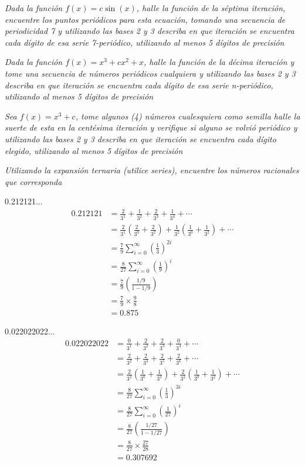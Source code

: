 \documentclass[11pt]{report}
\theoremstyle{plain}
\theoremstyle{definition}
\begin{document}
\textit{Dada la función $f (x) = c \sin(x) $, halle la función de la séptima iteración, encuentre los puntos periódicos para esta ecuación, tomando una secuencia de periodicidad 7 y utilizando las bases 2 y 3 describa en que iteración se encuentra cada dígito de esa serie 7-periódico, utilizando al menos 5 dígitos de precisión}

\textit{Dada la función $f(x) = x^3 + cx^2 + x$, halle la función de la décima iteración y tome una secuencia de números periódicos cualquiera y utilizando las bases 2 y 3 describa en que iteración se encuentra cada dígito de esa serie n-periódico, utilizando al menos 5 dígitos de precisión}

\textit{Sea $f (x) = x^3 + c$, tome algunos (4) números cualesquiera como semilla halle la suerte de esta en la centésima iteración y verifique si alguno se volvió periódico y utilizando las bases 2 y 3 describa en que iteración se encuentra cada dígito elegido, utilizando al menos 5 dígitos de precisión}

\textit{Utilizando la expansión ternaria (utilice series), encuentre los números racionales que corresponda}

0.212121...\\

\begin{align*}
	0.212121 &= \frac{2}{3^1}+\frac{1}{3^2}+\frac{2}{3^3}+\frac{1}{3^4}+\cdots \\
	&= \frac{2}{3^1} \left(\frac{2}{3^0}+\frac{2}{3^2}\right) + \frac{1}{3^2} \left(\frac{1}{3^0} +\frac{1}{3^2}\right)+\cdots\\
	&= \frac{7}{9} \sum^\infty_{i=0} \left(\frac{1}{3}\right)^{2i}\\
	&= \frac{8}{27} \sum^\infty_{i=0} \left(\frac{1}{9}\right)^{i}\\
	&= \frac{7}{9} \left(\frac{1/9}{1-1/9}\right)\\
	&= \frac{7}{9}\times \frac{9}{8}\\
	&= 0.875
\end{align*}

0.022022022...\\

\begin{align*}
	0.022022022 &= \frac{0}{3^1}+\frac{2}{3^2}+\frac{2}{3^3}+\frac{0}{3^4}+\cdots \\
	&= \frac{2}{3^2}+\frac{2}{3^3}+\frac{2}{3^5}+\frac{2}{3^6}+\cdots\\
	&= \frac{2}{3^2} \left(\frac{1}{3^0}+\frac{1}{3^3}\right) + \frac{2}{3^2} \left(\frac{1}{3^0} +\frac{1}{3^2}\right)+\cdots\\
	&= \frac{8}{27} \sum^\infty_{i=0} \left(\frac{1}{3}\right)^{3i}\\
	&= \frac{8}{27} \sum^\infty_{i=0} \left(\frac{1}{27}\right)^{i}\\
	&= \frac{8}{27} \left(\frac{1/27}{1-1/27}\right)\\
	&= \frac{8}{27}\times \frac{27}{28}\\
	&= 0.307692
\end{align*}
\end{document}
